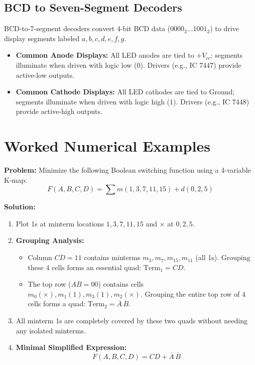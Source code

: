 \subsection{BCD to Seven-Segment Decoders}
BCD-to-7-segment decoders convert 4-bit BCD data ($0000_2 \dots 1001_2$) to drive display segments labeled $a, b, c, d, e, f, g$.
\begin{itemize}
    \item \textbf{Common Anode Displays:} All LED anodes are tied to $+V_{cc}$; segments illuminate when driven with logic low ($0$). Drivers (e.g., IC 7447) provide active-low outputs.
    \item \textbf{Common Cathode Displays:} All LED cathodes are tied to Ground; segments illuminate when driven with logic high ($1$). Drivers (e.g., IC 7448) provide active-high outputs.
\end{itemize}

\section{Worked Numerical Examples}

\begin{examplebox}
\textbf{Problem:} Minimize the following Boolean switching function using a 4-variable K-map:
\begin{equation}
F(A, B, C, D) = \sum m(1, 3, 7, 11, 15) + d(0, 2, 5)
\end{equation}

\textbf{Solution:}
\begin{enumerate}
    \item Plot 1s at minterm locations $1, 3, 7, 11, 15$ and $\times$ at $0, 2, 5$.
    \item \textbf{Grouping Analysis:}
    \begin{itemize}
        \item Column $CD = 11$ contains minterms $m_3, m_7, m_{15}, m_{11}$ (all 1s). Grouping these 4 cells forms an essential quad: $\text{Term}_1 = C D$.
        \item The top row ($AB = 00$) contains cells $m_0(\times), m_1(1), m_3(1), m_2(\times)$. Grouping the entire top row of 4 cells forms a quad: $\text{Term}_2 = \overline{A}\,\overline{B}$.
    \end{itemize}
    \item All minterm 1s are completely covered by these two quads without needing any isolated minterms.
    \item \textbf{Minimal Simplified Expression:}
    \begin{equation}
    F(A, B, C, D) = C D + \overline{A}\,\overline{B}
    \end{equation}
\end{enumerate}
\end{examplebox}

